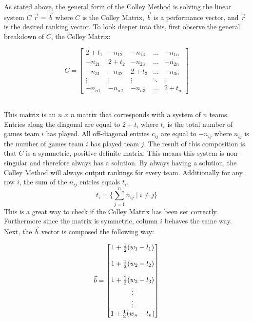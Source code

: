 \documentclass[12pt]{article}
\begin{document}
As stated above, the general form of the Colley Method is solving the linear system $C$ $\vec{r}$ = $\vec{b}$ where $C$ is the Colley Matrix, $\vec{b}$ is a performance vector, and $\vec{r}$ is the desired ranking vector. To look deeper into this, first observe the general breakdown of $C$, the Colley Matrix:
\begin{center}
\[
C =
\begin{bmatrix}
2+t_1 & -n_{12} & -n_{13} & \hdots & -n_{1n}\\
-n_{21} & 2+t_2 & -n_{23} & \hdots & -n_{2n}\\
-n_{31} & -n_{32} & 2+t_3 & \hdots & -n_{3n}\\
\vdots & \vdots & \vdots & \ddots & \vdots\\
-n_{n1} & -n_{n2} & -n_{n3}& \hdots & 2+t_n
\end{bmatrix}
\]
\end{center}
~\\
This matrix is an $n$ $x$ $n$ matrix that corresponds with a system of $n$ teams. Entries along the diagonal are equal to $2 + t_i$ where $t_i$ is the total number of games team $i$ has played. All off-diagonal entries $c_{ij}$ are equal to $-n_{ij}$ where $n_{ij}$ is the number of games team $i$ has played team $j$. The result of this composition is that $C$ is a symmetric, positive definite matrix. This means this system is non-singular and therefore always has a solution. By always having a solution, the Colley Method will always output rankings for every team. Additionally for any row $i$,
the sum of the $n_{ij}$ entries equals $t_i$.
\begin{equation}
t_i = \Big\{\sum_{j=1}^{n} n_{ij} \mid i \neq j\Big\}
\end{equation}
This is a great way to check if the Colley Matrix has been set correctly. Furthermore since the matrix is symmetric, column $i$ behaves the same way. Next, the $\vec{b}$ vector is composed the following way:
\begin{center}
\[
\vec{b} =
\begin{bmatrix}
1 + \frac{1}{2}(w_1 - l_1)\\
\space\\
1 + \frac{1}{2}(w_2 - l_2)\\
\space\\
1 + \frac{1}{2}(w_3 - l_3)\\
\vdots\\
\vdots\\
1 + \frac{1}{2}(w_n - l_n)\\
\end{bmatrix}
\]
\end{center}
\end{document}
